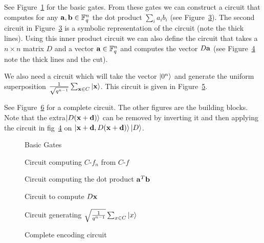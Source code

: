 \documentclass{Rinton-P9x6}
\newcommand {\ket} [1] {\ensuremath \left\vert#1\ensuremath \right\rangle}
\newcommand{\GF}[2][]{{\ensuremath{\mathbb{F}_{#2}^{#1}}}}
\renewcommand{\a}{{\bf a}}
\renewcommand{\b}{{\bf b}}
\renewcommand{\d}{{\bf d}}
\newcommand{\x}{{\bf x}}
\begin{document}
\newpage

See Figure~\ref{figbasicgates} for the basic gates. From these gates
we can construct a circuit that computes for any $\a,\b \in \GF[n]{q}$
the dot product $\sum_i a_i b_i$ (see Figure~\ref{figdotproduct}). The
second circuit in Figure~\ref{figdotproduct} is a symbolic
representation of the circuit (note the thick lines). Using this inner
product circuit we can also define the circuit that takes a $n\times
n$ matrix $D$ and a vector $\a\in \GF[n]{q}$ and computes the vector
$D\a$ (see Figure~\ref{figmatvect} note the thick lines and the cut).

We also need a circuit which will take the vector $\ket{0^n}$ and
generate the uniform superposition $\frac{1}{\sqrt{q^{n-1}}} \sum_{\x
  \in C} \ket{\x}$. This circuit is given in Figure~\ref{figuniformC}.

See Figure~\ref{figencode} for a complete circuit. The other figures
are the building blocks. Note that the extra$\ket{D(\x+\d)}$ can be
removed by inverting it and then applying the circuit in
fig~\ref{figmatvect} on $\ket{\x+\d,D(\x+\d)}\ket{D}$.\\

\vspace{1cm}

\begin{figure}[h]
  
  \caption{Basic Gates}
  \label{figbasicgates}
\end{figure}

\begin{figure}[h]
  
  \caption{Circuit computing $C\textrm{-}f_n$ from $C\textrm{-}f$}
  \label{figCfn}
\end{figure}


\begin{figure}[h]
  
  \caption{Circuit computing the dot product $\a^T\b$}
  \label{figdotproduct}
\end{figure}

\begin{figure}[h]
    
  \caption{Circuit to compute $D\x$}
  \label{figmatvect}
\end{figure}

\begin{figure}[h]
  
  \caption{Circuit generating $\sqrt{\frac{1}{q^{n-1}}} \sum_{x \in C} \ket{x}$}
  \label{figuniformC}
\end{figure}

\begin{figure}[h]
  
  \caption{Complete encoding circuit}
  \label{figencode}
\end{figure}
\end{document}

